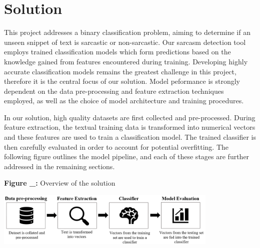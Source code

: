 \documentclass[12pt,a4paper]{article}
\begin{document}
\newpage
\section{Solution}
\noindent This project addresses a binary classification problem, aiming to determine if an unseen snippet of text is sarcastic or non-sarcastic. Our sarcasm detection tool employs trained classification models which form  predictions based on the knowledge gained from features encountered during training. Developing highly accurate classification models remains the greatest challenge in this project, therefore it is the central focus of our solution. Model peformance is strongly dependent on the data pre-processing and feature extraction techniques employed, as well as the choice of model architecture and training procedures. 

In our solution, high quality datasets are first collected and pre-processed. During feature extraction, the textual training data is transformed into numerical vectors and these features are used to train a classification model. The trained classifier is then carefully evaluated in order to account for potential overfitting. The following figure outlines the model pipeline, and each of these stages are further addressed in the remaining sections.



\begin{center}
	\textbf{Figure \_:} Overview of the solution
\end{center}
\begin{center}
	\includegraphics[width=0.8\textwidth]{Images/modelpipeline2.png}
	\label{Model Pipeline}
\end{center}
\end{document}
